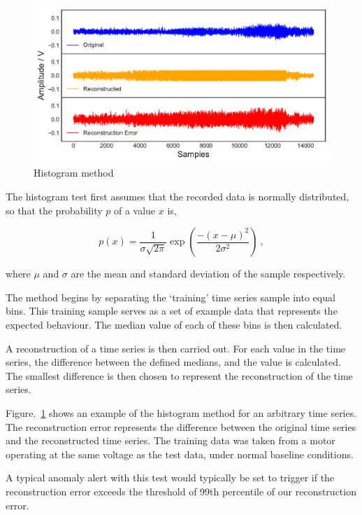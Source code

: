 \begin{figure}[t]
    \includegraphics[width=1.0\textwidth]{fig/histogram.pdf}
    \caption[Histogram]{Histogram method}
    \label{fig:histogram}
\end{figure}

The histogram test first assumes that the recorded data is normally distributed, so that the probability $p$ of a value $x$ is,

\begin{equation}
    p(x) = \dfrac{1}{\sigma \sqrt{2\pi}}\exp(\dfrac{-{(x-\mu)}^2}{2\sigma^2})~,
\end{equation}

where $\mu$ and $\sigma$ are the mean and standard deviation of the sample respectively.

The method begins by separating the `training' time series sample into equal bins. This training sample serves as a set of example data that represents the expected behaviour. The median value of each of these bins is then calculated.

A reconstruction of a time series is then carried out. For each value in the time series, the difference between the defined medians, and the value is calculated. The smallest difference is then chosen to represent the reconstruction of the time series.

Figure.~\ref{fig:histogram} shows an example of the histogram method for an arbitrary time series. The reconstruction error represents the difference between the original time series and the reconstructed time series. The training data was taken from a motor operating at the same voltage as the test data, under normal baseline conditions.

A typical anomaly alert with this test would typically be set to trigger if the reconstruction error exceeds the threshold of 99th percentile of our reconstruction error.


